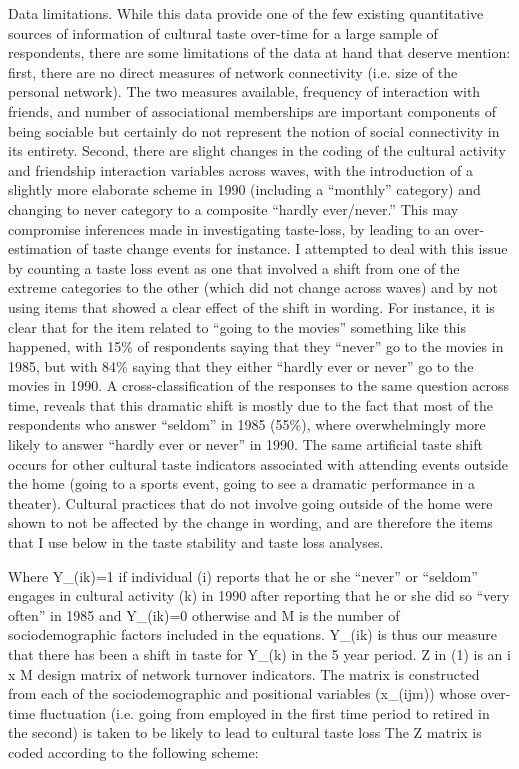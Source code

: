 Data limitations. While this data provide one of the few existing quantitative sources of information of cultural taste over-time for a large sample of respondents, there are some limitations of the data at hand that deserve mention: first, there are no direct measures of network connectivity (i.e. size of the personal network). The two measures available, frequency of interaction with friends, and number of associational memberships are important components of being sociable but certainly do not represent the notion of social connectivity in its entirety. Second, there are slight changes in the coding of the cultural activity and friendship interaction variables across waves, with the introduction of a slightly more elaborate scheme in 1990 (including a “monthly” category) and changing to never category to a composite “hardly ever/never.” This may compromise inferences made in investigating taste-loss, by leading to an over-estimation of taste change events for instance. I attempted to deal with this issue by counting a taste loss event as one that involved a shift from one of the extreme categories to the other (which did not change across waves) and by not using items that showed a clear effect of the shift in wording. For instance, it is clear that for the item related to “going to the movies” something like this happened, with 15\% of respondents saying that they “never” go to the movies in 1985, but with 84\% saying that they either “hardly ever or never” go to the movies in 1990. A cross-classification of the responses to the same question across time, reveals that this dramatic shift is mostly due to the fact that most of the respondents who answer “seldom” in 1985 (55\%), where overwhelmingly more likely to answer “hardly ever or never” in 1990. The same artificial taste shift occurs for other cultural taste indicators associated with attending events outside the home (going to a sports event, going to see a dramatic performance in a theater). Cultural practices that do not involve going outside of the home were shown to not be affected by the change in wording, and are therefore the items that I use below in the taste stability and taste loss analyses.

Where Y_(ik)=1 if individual (i) reports that he or she “never” or “seldom” engages in cultural activity (k) in 1990 after reporting that he or she did so “very often” in 1985 and Y_(ik)=0 otherwise and M is the number of sociodemographic factors included in the equations. Y_(ik) is thus our measure that there has been a shift in taste for Y_(k) in the 5 year period. Z in (1) is an i x M design matrix of network turnover indicators. The matrix is constructed from each of the sociodemographic and positional variables (x_(ijm)) whose over-time fluctuation (i.e. going from employed in the first time period to retired in the second) is taken to be likely to lead to cultural taste loss The Z matrix is coded according to the following scheme:

